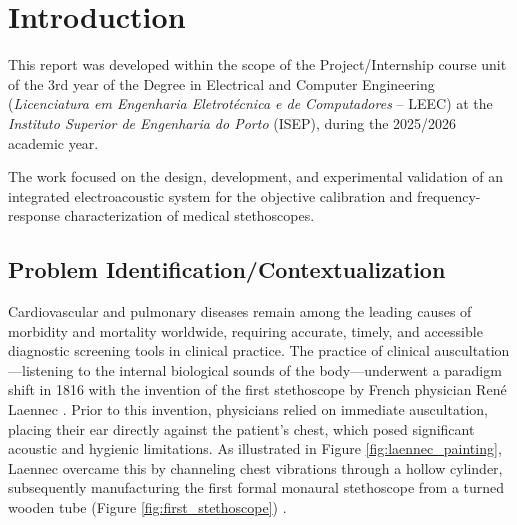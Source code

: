 
\chapter{Introduction}

This report was developed within the scope of the Project/Internship course unit of the 3rd year of the Degree in Electrical and Computer Engineering (\textit{Licenciatura em Engenharia Eletrotécnica e de Computadores} -- LEEC) at the \textit{Instituto Superior de Engenharia do Porto} (ISEP), during the 2025/2026 academic year.

The work focused on the design, development, and experimental validation of an integrated electroacoustic system for the objective calibration and frequency-response characterization of medical stethoscopes.

\section{Problem Identification/Contextualization}

Cardiovascular and pulmonary diseases remain among the leading causes of morbidity and mortality worldwide, requiring accurate, timely, and accessible diagnostic screening tools in clinical practice. The practice of clinical auscultation—listening to the internal biological sounds of the body—underwent a paradigm shift in 1816 with the invention of the first stethoscope by French physician René Laennec \cite{roguin2006rene}. Prior to this invention, physicians relied on immediate auscultation, placing their ear directly against the patient's chest, which posed significant acoustic and hygienic limitations. As illustrated in Figure \ref{fig:laennec_painting}, Laennec overcame this by channeling chest vibrations through a hollow cylinder, subsequently manufacturing the first formal monaural stethoscope from a turned wooden tube (Figure \ref{fig:first_stethoscope}) \cite{roguin2006rene}.


